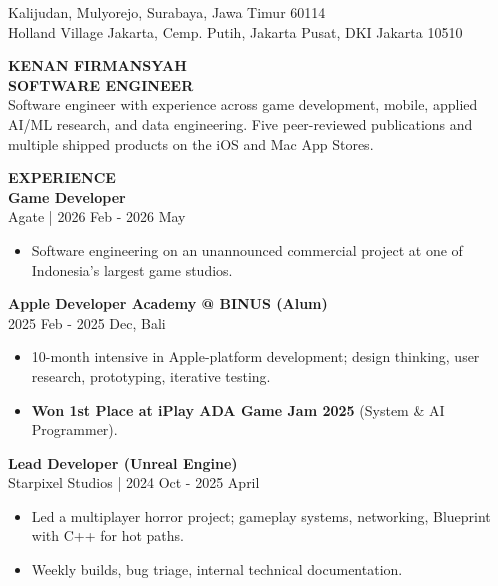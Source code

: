 \documentclass[11pt,a4paper]{article}
\newcommand{\mainsection}[1]{%
    {\large\bfseries\MakeUppercase{#1}}\\[8pt]%
}
\newcommand{\jobentry}[2]{%
    \textbf{#1}\\
    {\small\color{lighttext}#2}\\[4pt]%
}
\begin{document}
\begin{minipage}[t]{6cm}
\begin{minipage}[t]{5.5cm}
{\small\color{lighttext}Kalijudan, Mulyorejo, Surabaya, Jawa Timur 60114}\\[6pt]

{\small\color{lighttext}Holland Village Jakarta, Cemp. Putih, Jakarta Pusat, DKI Jakarta 10510}

\end{minipage}
\end{minipage}%
%
\begin{minipage}[t]{14cm}
\vspace{0.5cm}
\hspace{0.8cm}
\begin{minipage}[t]{12.5cm}

{\Huge\bfseries\MakeUppercase{Kenan Firmansyah}}\\[6pt]
{\large\bfseries SOFTWARE ENGINEER}\\[12pt]

{\small Software engineer with experience across game development, mobile, applied AI/ML research, and data engineering. Five peer-reviewed publications and multiple shipped products on the iOS and Mac App Stores.}

\vspace{0.6cm}

\mainsection{Experience}

\jobentry{Game Developer}{Agate | 2026 Feb - 2026 May}
\begin{itemize}[leftmargin=*, nosep, itemsep=2pt, topsep=2pt]
    \item Software engineering on an unannounced commercial project at one of Indonesia's largest game studios.
\end{itemize}

\vspace{0.3cm}

\jobentry{Apple Developer Academy @ BINUS (Alum)}{2025 Feb - 2025 Dec, Bali}
\begin{itemize}[leftmargin=*, nosep, itemsep=2pt, topsep=2pt]
    \item 10-month intensive in Apple-platform development; design thinking, user research, prototyping, iterative testing.
    \item \textbf{Won 1st Place at iPlay ADA Game Jam 2025} (System \& AI Programmer).
\end{itemize}

\vspace{0.3cm}

\jobentry{Lead Developer (Unreal Engine)}{Starpixel Studios | 2024 Oct - 2025 April}
\begin{itemize}[leftmargin=*, nosep, itemsep=2pt, topsep=2pt]
    \item Led a multiplayer horror project; gameplay systems, networking, Blueprint with C++ for hot paths.
    \item Weekly builds, bug triage, internal technical documentation.
\end{itemize}


\end{minipage}
\end{minipage}
\end{document}
